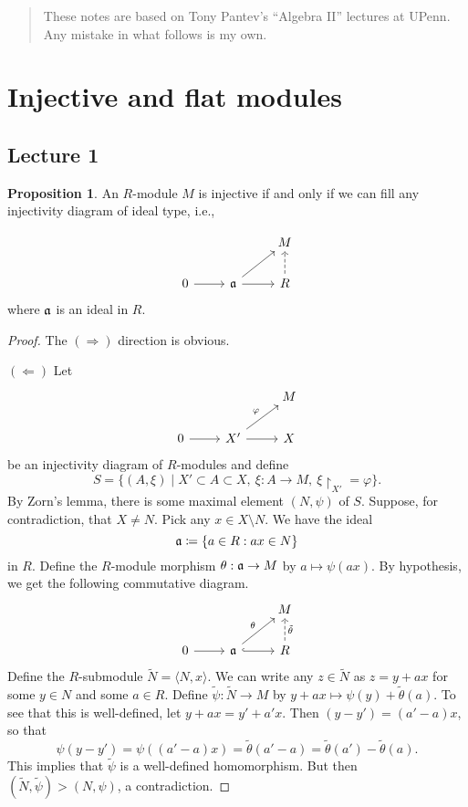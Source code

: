 \documentclass[10pt,letterpaper,cm]{nupset}
\theoremstyle{definition}
\theoremstyle{theorem}
\newtheorem{prop}[definition]{Proposition}
\theoremstyle{remark}
\newcommand{\1}{\mathbf{1}}
\newcommand{\0}{\vec 0}
\begin{document}
\begin{abstract}
These notes are based on Tony Pantev's ``Algebra II'' lectures at UPenn. Any mistake in what follows is my own.
\end{abstract}

\tableofcontents
\newpage

\section{Injective and flat modules}

\subsection{Lecture 1}

\begin{prop} An $R$-module $M$ is injective if and only if we can fill any injectivity diagram of ideal type, i.e.,  

\[
\begin{tikzcd}
 &  & M \\
0 \arrow[r] & \frak{a} \arrow[r] \arrow[ru] & R \arrow[u, dashed]
\end{tikzcd}
\] 
where $\frak{a}$ is an ideal in $R$.
\end{prop}
\begin{proof}
The $(\Longrightarrow)$ direction is obvious.

\medskip


$(\Longleftarrow)$ Let 
\[
\begin{tikzcd}
 &  & M \\
0 \arrow[r] & X' \arrow[ru, "\varphi"] \arrow[r] & X
\end{tikzcd} \] 
be an injectivity diagram of $R$-modules and define $$S = \{(A, \xi) \mid X' \subset A \subset X, \ \xi : A \to M, \ \xi \restriction_{X'} = \varphi\} . $$ By Zorn's lemma, there is some maximal element $(N, \psi)$ of $S$. Suppose, for contradiction, that $X \ne N$. Pick any $x\in X \setminus N$. We have the ideal $$\frak{a} \coloneqq  \{a \in R : ax \in N\}$$ in $R$. Define the $R$-module morphism $\theta : \frak{a} \to M$ by $a \mapsto \psi(ax)$. By hypothesis, we get the following commutative diagram.
\[
\begin{tikzcd}
 &  & M \\
0 \arrow[r] & \frak{a} \arrow[ru, "\theta"] \arrow[r, hook] & R \arrow[u, "\tilde{\theta}"', dashed]
\end{tikzcd}
\] Define the $R$-submodule $\widetilde{N} = \langle N, x\rangle$. We can write any $z\in \widetilde{N}$ as $z = y + ax$ for some $y\in N$ and some $a\in R$. Define $\tilde{\psi} : \widetilde{N} \to M$ by $y+ax \mapsto \psi(y) + \tilde{\theta}(a)$. To see that this is well-defined, let $y+ax = y'+a'x$. Then $(y-y') = (a'-a)x$, so that $$\psi(y-y') = \psi((a'-a)x) = \tilde{\theta}(a'-a) = \tilde{\theta}(a') - \tilde{\theta}(a) . $$
This implies that $\tilde{\psi}$ is a well-defined homomorphism. But then $\left(\widetilde{N}, \tilde{\psi}\right)> (N, \psi)$, a contradiction.  
\end{proof}
\end{document}
